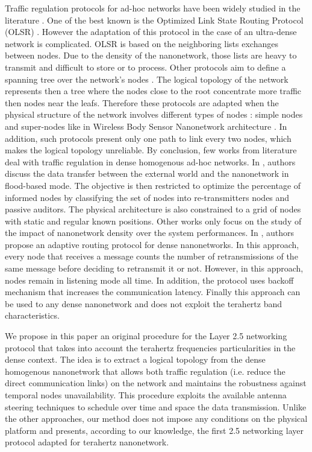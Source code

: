 \documentclass[letterpaper, 10 pt, conference]{ieeeconf}
\begin{document}
Traffic regulation protocols for ad-hoc networks have been widely studied in the literature \cite{oslr,most,dynstp}. One of the best known is the Optimized Link State Routing Protocol (OLSR) \cite{olsr}. However the adaptation of this protocol in the case of an ultra-dense network is complicated. OLSR is based on the neighboring lists exchanges between nodes. Due to the density of the nanonetwork, those lists are heavy to transmit and difficult to store or to process. Other protocols aim to define a spanning tree over the network's nodes \cite{stp}. The logical topology of the network represents then a tree where the nodes close to the root concentrate more traffic then nodes near the leafs. Therefore these protocols are adapted when the physical structure of the network involves different types of nodes : simple nodes and super-nodes like in Wireless Body Sensor Nanonetwork architecture \cite{afsana}. In addition, such protocols present only one path to link every two nodes, which makes the logical topology unreliable. By conclusion, few works from literature deal with traffic regulation in dense homogenous ad-hoc networks. In \cite{dense1}, authors discuss the data transfer between the external world and the nanonetwork in flood-based mode. The objective is then restricted to optimize the percentage of informed nodes by classifying the set of nodes into re-transmitters nodes and passive auditors. The physical architecture is also constrained to a grid of nodes with static and regular known positions. Other works \cite{asrhtsook,zhang} only focus on the study of the impact of nanonetwork density over the system performances. In \cite{arrabal}, authors propose an adaptive routing protocol for dense nanonetworks. In this approach, every node that receives a message counts the number of retransmissions of the same message before deciding to retransmit it or not. However, in this approach, nodes remain in listening mode all time. In addition, the protocol uses backoff mechanism that increases the communication latency. Finally this approach can be used to any dense nanonetwork and does not exploit the terahertz band characteristics.      

We propose in this paper an original procedure for the Layer 2.5 networking protocol that takes into account the terahertz frequencies particularities in the dense context. The idea is to extract a logical topology from the dense homogenous nanonetwork that allows both traffic regulation (i.e. reduce the direct communication links) on the network and maintains the robustness against temporal nodes unavailability. This procedure exploits the available antenna steering techniques to schedule over time and space the data transmission. Unlike the other approaches, our method does not impose any conditions on the physical platform and presents, according to our knowledge, the first 2.5 networking layer protocol adapted for terahertz nanonetwork.
\end{document}
